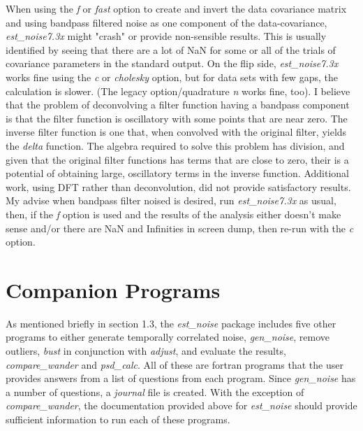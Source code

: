 \documentclass[12pt]{amsart}
\begin{document}
When using the \textit{f} or \textit{fast} option to create and invert the data covariance matrix and using
bandpass filtered noise as one component of the data-covariance, \textit{est\_noise7.3x} might "crash"
or provide non-sensible results. This is usually identified by seeing that there are a lot of NaN for some or
all of the trials of covariance parameters in the standard output. On the flip side, \textit{est\_noise7.3x} works
fine using the \textit{c} or \textit{cholesky} option, but for data sets with few gaps, the calculation is slower.
(The legacy option/quadrature \textit{n} works fine, too).  I believe that the problem of deconvolving a filter function
having a bandpass component is that the filter function is oscillatory with some points that are near zero. The inverse
filter function is one that, when convolved with the original filter, yields the \textit{delta} function. The algebra
required to solve this problem has division, and given that the original filter functions has terms that are close
to zero, their is a potential of obtaining large, oscillatory terms in the inverse function. Additional work, using
DFT rather than deconvolution, did not provide satisfactory results. My advise when bandpass filter noised is
desired, run  \textit{est\_noise7.3x} as usual, then, if the \textit{f} option is used and the results of the analysis either
doesn't make sense and/or there are NaN and Infinities in screen dump, then re-run with the \textit{c} option.


\section{Companion Programs}

As mentioned briefly in section 1.3, the \textit{est\_noise} package includes five other programs to
either generate temporally correlated noise, \textit{gen\_noise}, remove outliers, \textit{bust} in conjunction
with \textit{adjust}, and evaluate the results, \textit{compare\_wander} and \textit{psd\_calc}. All of these are
fortran programs that the user provides answers from a list of questions from each program. Since \textit{gen\_noise}
has a number of questions, a \textit{journal} file is created. With the exception of \textit{compare\_wander}, the documentation provided above for \textit{est\_noise}
should provide sufficient information to run each of these programs.
\end{document}
